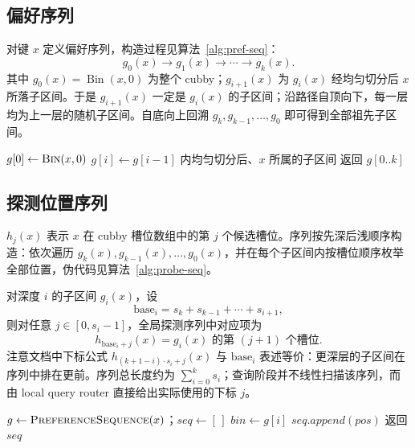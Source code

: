 \subsection{偏好序列}

对键 \(x\) 定义偏好序列，构造过程见算法~\ref{alg:pref-seq}：
\begin{equation}
  g_0(x)\rightarrow g_1(x)\rightarrow\cdots\rightarrow g_k(x).
\end{equation}
其中 \(g_0(x)=\operatorname{Bin}(x,0)\) 为整个 cubby；\(g_{i+1}(x)\) 为 \(g_i(x)\) 经均匀切分后 \(x\) 所落子区间。于是 \(g_{i+1}(x)\) 一定是 \(g_i(x)\) 的子区间；沿路径自顶向下，每一层均为上一层的随机子区间。自底向上回溯 \(g_k,g_{k-1},\ldots,g_0\) 即可得到全部祖先子区间。

\begin{algorithm}[htbp]
  \caption{PreferenceSequence：偏好序列}
  \label{alg:pref-seq}
  \begin{algorithmic}[1]
      \State $g[0]\gets\Call{Bin}{x,0}$
        \State $g[i]\gets g[i-1]$ 内均匀切分后、$x$ 所属的子区间
      \EndFor
      \State 返回 $g[0..k]$
    \EndFunction
  \end{algorithmic}
\end{algorithm}

\subsection{探测位置序列}

\(h_j(x)\) 表示 \(x\) 在 cubby 槽位数组中的第 \(j\) 个候选槽位。序列按先深后浅顺序构造：依次遍历 \(g_k(x),g_{k-1}(x),\ldots,g_0(x)\)，并在每个子区间内按槽位顺序枚举全部位置，伪代码见算法~\ref{alg:probe-seq}。

对深度 \(i\) 的子区间 \(g_i(x)\)，设
\begin{equation}
  \mathrm{base}_i=s_k+s_{k-1}+\cdots+s_{i+1},
\end{equation}
则对任意 \(j\in[0,s_i-1]\)，全局探测序列中对应项为
\begin{equation}
  h_{\mathrm{base}_i+j}(x)=g_i(x)\text{ 的第 }(j+1)\text{ 个槽位}.
\end{equation}
注意文档中下标公式 \(h_{(k+1-i)\cdot s_i+j}(x)\) 与 \(\mathrm{base}_i\) 表述等价：更深层的子区间在序列中排在更前。序列总长度约为 \(\displaystyle\sum_{i=0}^{k}s_i\)；查询阶段并不线性扫描该序列，而由 local query router 直接给出实际使用的下标 \(j\)\cite{bender2022otsh,pagh2004linear}。

\begin{algorithm}[htbp]
  \caption{ProbeSequence：探测位置序列（先深后浅）}
  \label{alg:probe-seq}
  \begin{algorithmic}[1]
      \State $g\gets\Call{PreferenceSequence}{x}$；$\mathit{seq}\gets[\,]$
        \State $\mathit{bin}\gets g[i]$
          \State $\mathit{seq.append(pos)}$
        \EndFor
      \EndFor
      \State 返回 $\mathit{seq}$ 
    \EndFunction
  \end{algorithmic}
\end{algorithm}

